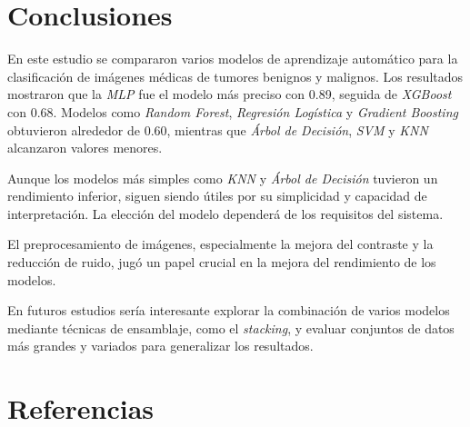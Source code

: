 \documentclass[12pt]{article}
\begin{document}
\section{Conclusiones}
En este estudio se compararon varios modelos de aprendizaje automático para la clasificación de imágenes médicas de tumores benignos y malignos. Los resultados mostraron que la \textit{MLP} fue el modelo más preciso con 0.89, seguida de \textit{XGBoost} con 0.68. Modelos como \textit{Random Forest}, \textit{Regresión Logística} y \textit{Gradient Boosting} obtuvieron alrededor de 0.60, mientras que \textit{Árbol de Decisión}, \textit{SVM} y \textit{KNN} alcanzaron valores menores.

Aunque los modelos más simples como \textit{KNN} y \textit{Árbol de Decisión} tuvieron un rendimiento inferior, siguen siendo útiles por su simplicidad y capacidad de interpretación. La elección del modelo dependerá de los requisitos del sistema.

El preprocesamiento de imágenes, especialmente la mejora del contraste y la reducción de ruido, jugó un papel crucial en la mejora del rendimiento de los modelos.

En futuros estudios sería interesante explorar la combinación de varios modelos mediante técnicas de ensamblaje, como el \textit{stacking}, y evaluar conjuntos de datos más grandes y variados para generalizar los resultados.
\section{Referencias}


\end{document}
